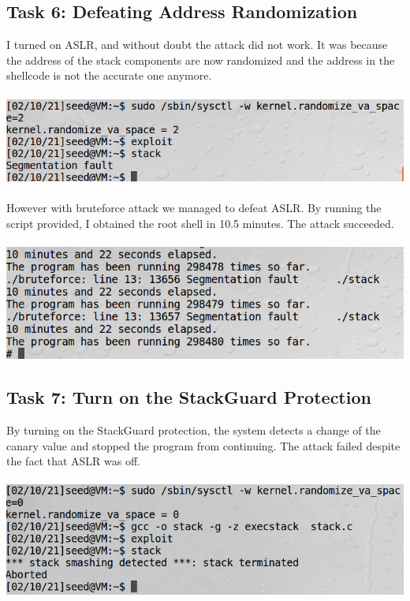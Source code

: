 \documentclass[a4paper]{article}
\begin{document}
\subsection{Task 6: Defeating Address Randomization}
I turned on ASLR, and without doubt the attack did not work. It was because the address of the stack components are now randomized and the address in the shellcode is not the accurate one anymore.\\\\
\includegraphics[scale=0.7]{2/13.png}\\\\
However with bruteforce attack we managed to defeat ASLR. By running the script provided, I obtained the root shell in 10.5 minutes. The attack succeeded.\\\\
\includegraphics[scale=0.7]{2/14.png}
\subsection{Task 7: Turn on the StackGuard Protection}
By turning on the StackGuard protection, the system detects a change of the canary value and stopped the program from continuing. The attack failed despite the fact that ASLR was off.\\\\
\includegraphics[scale=0.7]{2/15.png}
\end{document}
